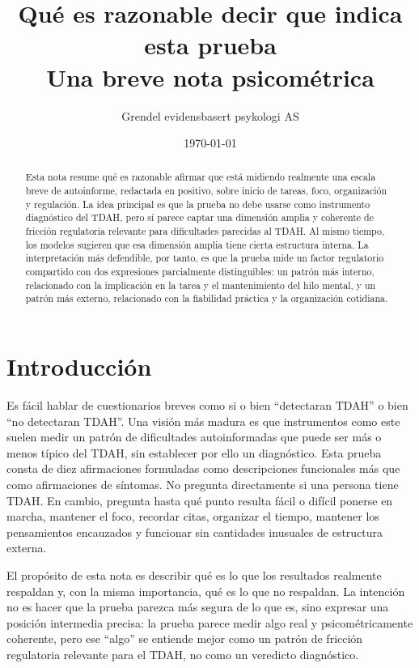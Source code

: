\documentclass[11pt,a4paper]{article}
\title{Qué es razonable decir que indica esta prueba\\
\large Una breve nota psicométrica}
\author{Grendel evidensbasert psykologi AS}
\date{\today}
\begin{document}
\maketitle

\begin{abstract}
Esta nota resume qué es razonable afirmar que está midiendo realmente una escala breve de autoinforme, redactada en positivo, sobre inicio de tareas, foco, organización y regulación. La idea principal es que la prueba no debe usarse como instrumento diagnóstico del TDAH, pero sí parece captar una dimensión amplia y coherente de fricción regulatoria relevante para dificultades parecidas al TDAH. Al mismo tiempo, los modelos sugieren que esa dimensión amplia tiene cierta estructura interna. La interpretación más defendible, por tanto, es que la prueba mide un factor regulatorio compartido con dos expresiones parcialmente distinguibles: un patrón más interno, relacionado con la implicación en la tarea y el mantenimiento del hilo mental, y un patrón más externo, relacionado con la fiabilidad práctica y la organización cotidiana.
\end{abstract}

\section{Introducción}
Es fácil hablar de cuestionarios breves como si o bien \enquote{detectaran TDAH} o bien \enquote{no detectaran TDAH}. Una visión más madura es que instrumentos como este suelen medir un patrón de dificultades autoinformadas que puede ser más o menos típico del TDAH, sin establecer por ello un diagnóstico. Esta prueba consta de diez afirmaciones formuladas como descripciones funcionales más que como afirmaciones de síntomas. No pregunta directamente si una persona tiene TDAH. En cambio, pregunta hasta qué punto resulta fácil o difícil ponerse en marcha, mantener el foco, recordar citas, organizar el tiempo, mantener los pensamientos encauzados y funcionar sin cantidades inusuales de estructura externa.

El propósito de esta nota es describir qué es lo que los resultados realmente respaldan y, con la misma importancia, qué es lo que no respaldan. La intención no es hacer que la prueba parezca más segura de lo que es, sino expresar una posición intermedia precisa: la prueba parece medir algo real y psicométricamente coherente, pero ese \enquote{algo} se entiende mejor como un patrón de fricción regulatoria relevante para el TDAH, no como un veredicto diagnóstico.
\end{document}
